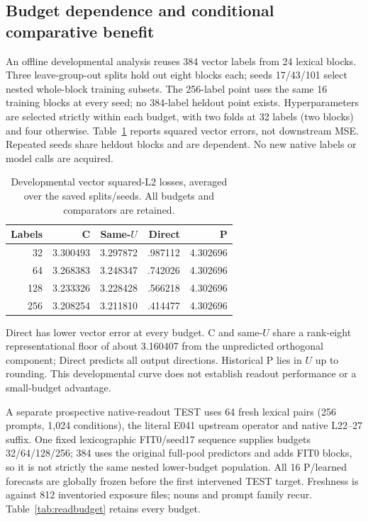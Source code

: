 \subsection{Budget dependence and conditional comparative benefit}\label{sec:budget}
An offline developmental analysis reuses 384 vector labels from 24 lexical blocks. Three leave-group-out splits hold out eight blocks each; seeds 17/43/101 select nested whole-block training subsets. The 256-label point uses the same 16 training blocks at every seed; no 384-label heldout point exists. Hyperparameters are selected strictly within each budget, with two folds at 32 labels (two blocks) and four otherwise. Table~\ref{tab:devbudget} reports squared vector errors, not downstream MSE. Repeated seeds share heldout blocks and are dependent. No new native labels or model calls are acquired.

\begin{table}[ht]\centering\small
\begin{tabular}{rrrrr}\toprule Labels & C & Same-$U$ & Direct & P\\\midrule
32 & 3.300493 & 3.297872 & .987112 & 4.302696\\
64 & 3.268383 & 3.248347 & .742026 & 4.302696\\
128 & 3.233326 & 3.228428 & .566218 & 4.302696\\
256 & 3.208254 & 3.211810 & .414477 & 4.302696\\\bottomrule
\end{tabular}
\caption{Developmental vector squared-L2 losses, averaged over the saved splits/seeds. All budgets and comparators are retained.}\label{tab:devbudget}
\end{table}
Direct has lower vector error at every budget. C and same-$U$ share a rank-eight representational floor of about 3.160407 from the unpredicted orthogonal component; Direct predicts all output directions. Historical P lies in $U$ up to rounding. This developmental curve does not establish readout performance or a small-budget advantage.

A separate prospective native-readout TEST uses 64 fresh lexical pairs (256 prompts, 1,024 conditions), the literal E041 upstream operator and native L22--27 suffix. One fixed lexicographic FIT0/seed17 sequence supplies budgets 32/64/128/256; 384 uses the original full-pool predictors and adds FIT0 blocks, so it is not strictly the same nested lower-budget population. All 16 P/learned forecasts are globally frozen before the first intervened TEST target. Freshness is against 812 inventoried exposure files; nouns and prompt family recur. Table~\ref{tab:readbudget} retains every budget.

